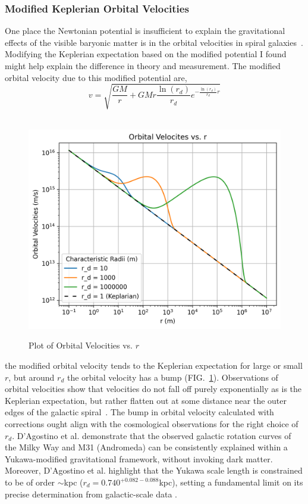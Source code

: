 \documentclass[aps,prd,preprint]{revtex4-1}
\begin{document}
\subsubsection*{Modified Keplerian Orbital Velocities}
One place the Newtonian potential is insufficient to explain the gravitational effects of the visible baryonic matter is in the orbital velocities in spiral galaxies~\cite{burstein_1985,freeman_1970}. Modifying the Keplerian expectation based on the modified potential I found might help explain the difference in theory and measurement. The modified orbital velocity due to this modified potential are,
\begin{equation}
    v = \sqrt{\frac{GM}{r} + GMr \frac{\ln(r_d)}{r_d} e^{-\frac{\ln(r_d)}{r_d} r}}
\end{equation}
\begin{figure}[H]\
    \centering
    \includegraphics[scale=0.75]{figures/graph_orbvelVr.png}
    \caption{Plot of Orbital Velocities vs. $r$}
    \label{fig:graph_orbvelVr}
\end{figure}
the modified orbital velocity tends to the Keplerian expectation for large or small $r$, but around $r_d$ the orbital velocity has a bump (FIG.~\ref{fig:graph_orbvelVr}). Observations of orbital velocities show that velocities do not fall off purely exponentially as is the Keplerian expectation, but rather flatten out at some distance near the outer edges of the galactic spiral~\cite{navarro_1997,brownstein_2006}. The bump in orbital velocity calculated with corrections ought align with the cosmological observations for the right choice of $r_d$. D'Agostino et al. demonstrate that the observed galactic rotation curves of the Milky Way and M31 (Andromeda) can be consistently explained within a Yukawa-modified gravitational framework, without invoking dark matter. Moreover, D'Agostino et al. highlight that the Yukawa scale length is constrained to be of order $\sim$kpc ($r_d=0.740^{+0.082-0.088}$kpc), setting a fundamental limit on its precise determination from galactic-scale data \cite{dagostino_2024}.
\end{document}
